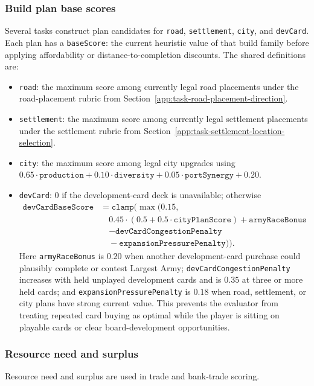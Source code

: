 \documentclass{article}
\begin{document}
\subsubsection{Build plan base scores}
\label{app:build-plan-base-scores}
Several tasks construct plan candidates for \texttt{road}, \texttt{settlement}, \texttt{city}, and \texttt{devCard}. Each plan has a \texttt{baseScore}: the current heuristic value of that build family before applying affordability or distance-to-completion discounts. The shared definitions are:
\begin{itemize}
    \item \texttt{road}: the maximum score among currently legal road placements under the road-placement rubric from Section~\ref{app:task-road-placement-direction}.
    \item \texttt{settlement}: the maximum score among currently legal settlement placements under the settlement rubric from Section~\ref{app:task-settlement-location-selection}.
    \item \texttt{city}: the maximum score among legal city upgrades using $0.65 \cdot \texttt{production} + 0.10 \cdot \texttt{diversity} + 0.05 \cdot \texttt{portSynergy} + 0.20$.
    \item \texttt{devCard}: $0$ if the development-card deck is unavailable; otherwise
    \[
    \begin{aligned}
    \texttt{devCardBaseScore}
    &= \texttt{clamp}\bigl(\max(0.15, \\
    &\quad 0.45 \cdot (0.5 + 0.5 \cdot \texttt{cityPlanScore})
    + \texttt{armyRaceBonus} \\
    &\quad - \texttt{devCardCongestionPenalty} \\
    &\quad - \texttt{expansionPressurePenalty})\bigr).
    \end{aligned}
    \]
    Here \texttt{armyRaceBonus} is $0.20$ when another development-card purchase could plausibly complete or contest Largest Army; \texttt{devCardCongestionPenalty} increases with held unplayed development cards and is $0.35$ at three or more held cards; and \texttt{expansionPressurePenalty} is $0.18$ when road, settlement, or city plans have strong current value. This prevents the evaluator from treating repeated card buying as optimal while the player is sitting on playable cards or clear board-development opportunities.
\end{itemize}

\subsubsection{Resource need and surplus}
\label{app:resource-need-and-surplus}
Resource need and surplus are used in trade and bank-trade scoring. 
\end{document}
